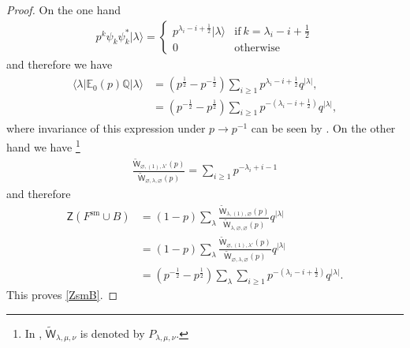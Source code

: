 \documentclass{amsart}
\theoremstyle{definition}
\newcommand{\QQ} {\mathbb{Q}}		%
\newcommand{\sm}{\mathrm{sm}}
\newcommand{\EE}{\mathbb{E}}
\newcommand{\sfW} {\mathsf{W}}
\newcommand{\sfZ} {\mathsf{Z}}
\begin{document}
\begin{proof}
On the one hand
\begin{align*} 
p^{k} \psi_k \psi_{k}^{*} | \lambda \rangle = \left\{ \begin{array}{cc} p^{\lambda_i - i + \frac{1}{2}} | \lambda \rangle & \mathrm{if \ } k = \lambda_i-i+\frac{1}{2} \\ 0 & \mathrm{otherwise} \end{array} \right.
\end{align*}
and therefore we have
\begin{align} 
\begin{split} \label{exprQE}
\langle \lambda | \EE_0(p) \QQ | \lambda \rangle &= (p^{\frac{1}{2}} - p^{-\frac{1}{2}}) \sum_{i \geq 1} p^{\lambda_i-i+\frac{1}{2}} q^{|\lambda|}, \\
&= (p^{-\frac{1}{2}} - p^{\frac{1}{2}}) \sum_{i \geq 1} p^{-(\lambda_i-i+\frac{1}{2})} q^{|\lambda|},
\end{split}
\end{align}
where invariance of this expression under $p \rightarrow p^{-1}$ can be seen by \cite[(3.8)]{ORV}. On the other hand we have \cite[(3.18)]{ORV}\footnote{In \cite{ORV}, $\tilde{\sfW}_{\lambda,\mu,\nu}$ is denoted by $P_{\lambda,\mu,\nu}$.}
\begin{align} \label{ORV}
\frac{\tilde{\sfW}_{\varnothing,(1),\lambda'}(p)}{\tilde{\sfW}_{\varnothing, \lambda, \varnothing}(p)} = \sum_{i \geq 1} p^{-\lambda_i+i-1}
\end{align}
and therefore
\begin{align*}
\sfZ(F^{\sm} \cup B) &= (1-p) \sum_\lambda \frac{\tilde{\sfW}_{\lambda, (1), \varnothing}(p)}{\tilde{\sfW}_{\lambda, \varnothing, \varnothing}(p)} q^{|\lambda|} \\
&= (1-p) \sum_\lambda \frac{\tilde{\sfW}_{\varnothing,(1),\lambda'}(p)}{\tilde{\sfW}_{\varnothing, \lambda, \varnothing}(p)} q^{|\lambda|} \\
&= (p^{-\frac{1}{2}} - p^{\frac{1}{2}}) \sum_{\lambda} \sum_{i \geq 1} p^{-(\lambda_i-i+\frac{1}{2})} q^{|\lambda|}.
\end{align*} 
This proves \eqref{ZsmB}. 


\end{proof}
\end{document}

